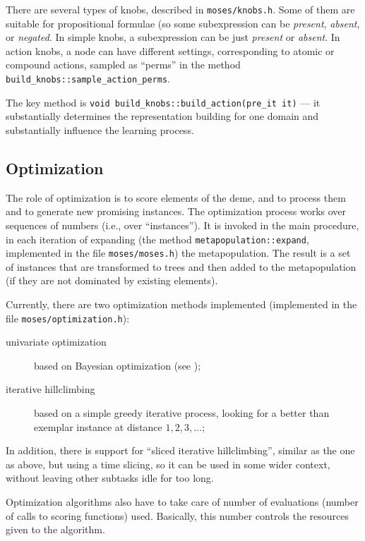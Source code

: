 \documentclass{article}
\begin{document}
There are several types of knobs, described in \verb|moses/knobs.h|.
Some of them are suitable for propositional formulae (so some subexpression
can be {\em present}, {\em absent}, or {\em negated}. In simple knobs,
a subexpression can be just {\em present} or {\em absent}.
In action knobs, a node can have different settings, corresponding
to atomic or compound actions, sampled as ``perms'' 
in the method \verb|build_knobs::sample_action_perms|.

The key method is \verb|void build_knobs::build_action(pre_it it)|
--- it substantially determines the representation building for
one domain and substantially influence the learning process.

\subsection{Optimization}

The role of optimization is to score elements of the deme, and to 
process them and to generate new promising instances. The optimization 
process works over sequences of numbers (i.e., over ``instances'').
It is invoked in the main procedure, in each iteration of expanding
(the method \verb|metapopulation::expand|, implemented in the file
\verb|moses/moses.h|) the metapopulation. The result is a set of 
instances that are transformed to trees and then added to the 
metapopulation (if they are not dominated by existing elements).  

Currently, there are two optimization methods implemented
(implemented in the file \verb|moses/optimization.h|): 
\begin{description}
\item[univariate optimization] based on Bayesian optimization (see \cite{6});

\item[iterative hillclimbing] based on a simple greedy iterative process, 
looking for a better than exemplar instance at distance $1, 2, 3, \ldots$;
\end{description}


In addition, there is support for ``sliced iterative hillclimbing'',
similar as the one as above, but using a time slicing, so it can be used
 in some wider context, without leaving other subtasks idle for too long.

Optimization algorithms also have to take care of number of evaluations
(number of calls to scoring functions) used. Basically, this number
controls the resources given to the algorithm.
\end{document}
